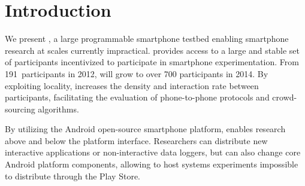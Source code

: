 \section{Introduction}
\label{sec-introduction}




We present \PhoneLab{}, a large programmable smartphone testbed enabling
smartphone research at scales currently impractical. \PhoneLab{} provides
access to a large and stable set of participants incentivized to participate
in smartphone experimentation. From 191~participants in 2012, \PhoneLab{}
will grow to over 700 participants in 2014. By exploiting locality,
\PhoneLab{} increases the density and interaction rate between participants,
facilitating the evaluation of phone-to-phone protocols and crowd-sourcing
algorithms.



By utilizing the Android open-source smartphone platform, \PhoneLab{} enables
research above and below the platform interface. Researchers can distribute
new interactive applications or non-interactive data loggers, but can also
change core Android platform components, allowing \PhoneLab{} to host systems
experiments impossible to distribute through the Play Store.

